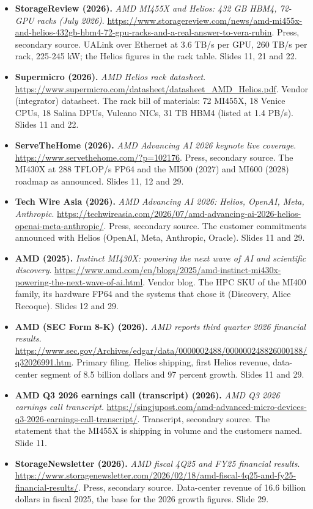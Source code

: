 \documentclass[11pt,letterpaper]{article}
\begin{document}
\begin{itemize}[leftmargin=1.2em,itemsep=3pt]
\item \textbf{StorageReview (2026).} \textit{AMD MI455X and Helios: 432 GB HBM4, 72-GPU racks (July 2026)}. \url{https://www.storagereview.com/news/amd-mi455x-and-helios-432gb-hbm4-72-gpu-racks-and-a-real-answer-to-vera-rubin}. Press, secondary source. UALink over Ethernet at 3.6 TB/s per GPU, 260 TB/s per rack, 225-245 kW; the Helios figures in the rack table. Slides 11, 21 and 22.
\item \textbf{Supermicro (2026).} \textit{AMD Helios rack datasheet}. \url{https://www.supermicro.com/datasheet/datasheet_AMD_Helios.pdf}. Vendor (integrator) datasheet. The rack bill of materials: 72 MI455X, 18 Venice CPUs, 18 Salina DPUs, Vulcano NICs, 31 TB HBM4 (listed at 1.4 PB/s). Slides 11 and 22.
\item \textbf{ServeTheHome (2026).} \textit{AMD Advancing AI 2026 keynote live coverage}. \url{https://www.servethehome.com/?p=102176}. Press, secondary source. The MI430X at 288 TFLOP/s FP64 and the MI500 (2027) and MI600 (2028) roadmap as announced. Slides 11, 12 and 29.
\item \textbf{Tech Wire Asia (2026).} \textit{AMD Advancing AI 2026: Helios, OpenAI, Meta, Anthropic}. \url{https://techwireasia.com/2026/07/amd-advancing-ai-2026-helios-openai-meta-anthropic/}. Press, secondary source. The customer commitments announced with Helios (OpenAI, Meta, Anthropic, Oracle). Slides 11 and 29.
\item \textbf{AMD (2025).} \textit{Instinct MI430X: powering the next wave of AI and scientific discovery}. \url{https://www.amd.com/en/blogs/2025/amd-instinct-mi430x-powering-the-next-wave-of-ai.html}. Vendor blog. The HPC SKU of the MI400 family, its hardware FP64 and the systems that chose it (Discovery, Alice Recoque). Slides 12 and 29.
\item \textbf{AMD (SEC Form 8-K) (2026).} \textit{AMD reports third quarter 2026 financial results}. \url{https://www.sec.gov/Archives/edgar/data/0000002488/000000248826000188/q32026991.htm}. Primary filing. Helios shipping, first Helios revenue, data-center segment of 8.5 billion dollars and 97 percent growth. Slides 11 and 29.
\item \textbf{AMD Q3 2026 earnings call (transcript) (2026).} \textit{AMD Q3 2026 earnings call transcript}. \url{https://singjupost.com/amd-advanced-micro-devices-q3-2026-earnings-call-transcript/}. Transcript, secondary source. The statement that the MI455X is shipping in volume and the customers named. Slide 11.
\item \textbf{StorageNewsletter (2026).} \textit{AMD fiscal 4Q25 and FY25 financial results}. \url{https://www.storagenewsletter.com/2026/02/18/amd-fiscal-4q25-and-fy25-financial-results/}. Press, secondary source. Data-center revenue of 16.6 billion dollars in fiscal 2025, the base for the 2026 growth figures. Slide 29.

\end{itemize}
\end{document}
